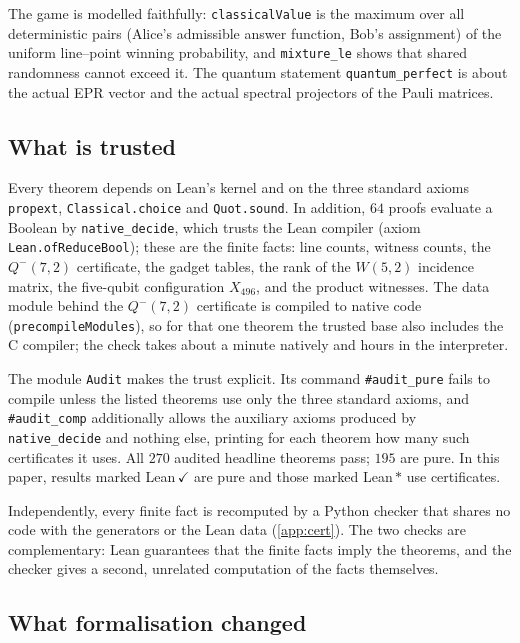 \documentclass[a4paper,onecolumn,11pt,unpublished,nopdfoutputerror]{quantumarticle}
\theoremstyle{definition}
\newcommand{\ding}{\ensuremath{\checkmark}}
\newcommand{\lname}[1]{\texttt{\textcolor{leangreen}{#1}}}
\newcommand{\W}[1]{W(#1,2)}
\newcommand{\Qm}[1]{Q^{-}(#1,2)}
\begin{document}
The game is modelled faithfully: \lname{classicalValue} is the maximum over all deterministic pairs (Alice's
admissible answer function, Bob's assignment) of the uniform line--point winning probability, and
\lname{mixture\_le} shows that shared randomness cannot exceed it. The quantum statement
\lname{quantum\_perfect} is about the actual EPR vector and the actual spectral projectors of the Pauli matrices.

\subsection{What is trusted}

Every theorem depends on Lean's kernel and on the three standard axioms \texttt{propext},
\texttt{Classical.choice} and \texttt{Quot.sound}. In addition, $64$ proofs evaluate a Boolean by
\texttt{native\_decide}, which trusts the Lean compiler (axiom \texttt{Lean.ofReduceBool}); these are the finite
facts: line counts, witness counts, the $\Qm7$ certificate, the gadget tables, the rank of the $\W5$ incidence
matrix, the five-qubit configuration $X_{496}$, and the product witnesses. The data module behind the $\Qm7$
certificate is compiled to native code (\texttt{precompileModules}), so for that one theorem the trusted base also
includes the C compiler; the check takes about a minute natively and hours in the interpreter.

The module \texttt{Audit} makes the trust explicit. Its command \texttt{\#audit\_pure} fails to compile unless the
listed theorems use only the three standard axioms, and \texttt{\#audit\_comp} additionally allows the auxiliary
axioms produced by \texttt{native\_decide} and nothing else, printing for each theorem how many such certificates
it uses. All $270$ audited headline theorems pass; $195$ are pure. In this paper, results marked
\textcolor{leangreen}{\textsf{Lean\,\ding}} are pure and those marked \textcolor{leangreen}{\textsf{Lean\,$\ast$}}
use certificates.

Independently, every finite fact is recomputed by a Python checker that shares no code with the generators or the
Lean data (\cref{app:cert}). The two checks are complementary: Lean guarantees that the finite facts imply the
theorems, and the checker gives a second, unrelated computation of the facts themselves.

\subsection{What formalisation changed}
\end{document}
